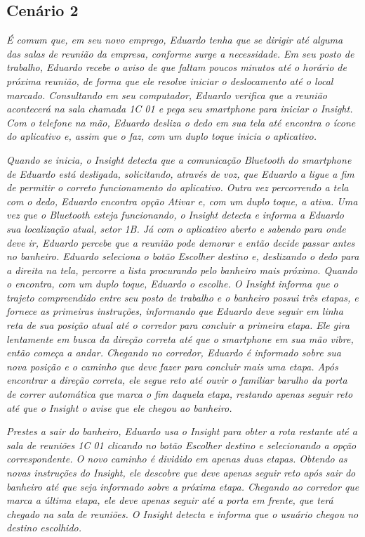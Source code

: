 \documentclass[twoside,english,brazilian]{UNISINOSartigo}
\begin{document}
\FloatBarrier
\subsection{Cenário 2}
\textit{É comum que, em seu novo emprego, Eduardo tenha que se dirigir até alguma das salas de reunião da empresa, conforme surge a necessidade. Em seu posto de trabalho, Eduardo recebe o aviso de que faltam poucos minutos até o horário de próxima reunião, de forma que ele resolve iniciar o deslocamento até o local marcado. Consultando em seu computador, Eduardo verifica que a reunião acontecerá na sala chamada 1C 01 e pega seu smartphone para iniciar o Insight. Com o telefone na mão, Eduardo desliza o dedo em sua tela até encontra o ícone do aplicativo e, assim que o faz, com um duplo toque inicia o aplicativo.}

\textit{Quando se inicia, o Insight detecta que a comunicação Bluetooth do smartphone de Eduardo está desligada, solicitando, através de voz, que Eduardo a ligue a fim de permitir o correto funcionamento do aplicativo. Outra vez percorrendo a tela com o dedo, Eduardo encontra opção Ativar e, com um duplo toque, a ativa. Uma vez que o Bluetooth esteja funcionando, o Insight detecta e informa a Eduardo sua localização atual, setor 1B. Já com o aplicativo aberto e sabendo para onde deve ir, Eduardo percebe que a reunião pode demorar e então decide passar antes no banheiro. Eduardo seleciona o botão Escolher destino e, deslizando o dedo para a direita na tela, percorre a lista procurando pelo banheiro mais próximo. Quando o encontra, com um duplo toque, Eduardo o escolhe. O Insight informa que o trajeto compreendido entre seu posto de trabalho e o banheiro possui três etapas, e fornece as primeiras instruções, informando que Eduardo deve seguir em linha reta de sua posição atual até o corredor para concluir a primeira etapa. Ele gira lentamente em busca da direção correta até que o smartphone em sua mão vibre, então começa a andar. Chegando no corredor, Eduardo é informado sobre sua nova posição e o caminho que deve fazer para concluir mais uma etapa. Após encontrar a direção correta, ele segue reto até ouvir o familiar barulho da porta de correr automática que marca o fim daquela etapa, restando apenas seguir reto até que o Insight o avise que ele chegou ao banheiro.}

\textit{Prestes a sair do banheiro, Eduardo usa o Insight para obter a rota restante até a sala de reuniões 1C 01 clicando no botão Escolher destino e selecionando a opção correspondente. O novo caminho é dividido em apenas duas etapas. Obtendo as novas instruções do Insight, ele descobre que deve apenas seguir reto após sair do banheiro até que seja informado sobre a próxima etapa. Chegando ao corredor que marca a última etapa, ele deve apenas seguir até a porta em frente, que terá chegado na sala de reuniões. O Insight detecta e informa que o usuário chegou no destino escolhido.}
\end{document}
